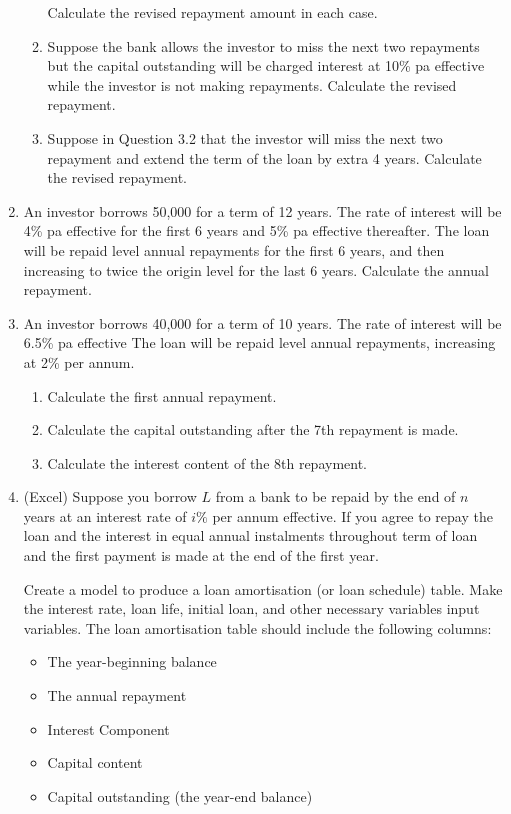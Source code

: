 \documentclass[
]{article}
\theoremstyle{definition}
\theoremstyle{definition}
\theoremstyle{definition}
\theoremstyle{definition}
\theoremstyle{remark}
\begin{document}
\begin{enumerate}
\begin{enumerate}
    Calculate the revised repayment amount in each case.
  \item
    Suppose the bank allows the
    investor to miss the next two repayments but the capital
    outstanding will be charged interest at 10\% pa effective while
    the investor is not making repayments. Calculate the revised
    repayment.
  \item
    Suppose in Question 3.2 that the investor will miss the next two
    repayment and extend the term of the loan by extra 4 years.
    Calculate the revised repayment.
  \end{enumerate}
\item
  An investor borrows 50,000 for a term of 12 years. The rate of
  interest will be 4\% pa effective for the first 6 years and 5\% pa
  effective thereafter. The loan will be repaid level annual
  repayments for the first 6 years, and then increasing to twice the
  origin level for the last 6 years. Calculate the annual repayment.
\item
  An investor borrows 40,000 for a term of 10 years. The rate of
  interest will be 6.5\% pa effective The loan will be repaid level
  annual repayments, increasing at 2\% per annum.

  \begin{enumerate}
  \def\labelenumii{\arabic{enumii}.}
  \item
    Calculate the first annual repayment.
  \item
    Calculate the capital outstanding after the 7th repayment is
    made.
  \item
    Calculate the interest content of the 8th repayment.
  \end{enumerate}
\item
  (Excel) Suppose you borrow \(L\) from a bank to be repaid by the end
  of \(n\) years at an interest rate of \(i\%\) per annum effective. If
  you agree to repay the loan and the interest in equal annual
  instalments throughout term of loan and the first payment is made at
  the end of the first year.

  Create a model to produce a loan amortisation (or loan schedule)
  table. Make the interest rate, loan life, initial loan, and other
  necessary variables input variables. The loan amortisation table
  should include the following columns:

  \begin{itemize}
  \item
    The year-beginning balance
  \item
    The annual repayment
  \item
    Interest Component
  \item
    Capital content
  \item
    Capital outstanding (the year-end balance)
  \end{itemize}
\end{enumerate}
\end{document}
